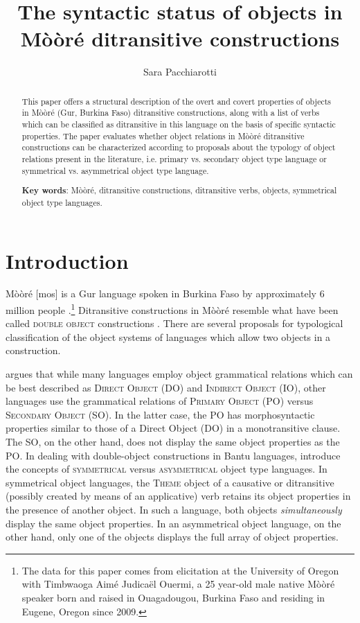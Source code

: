 \documentclass[output=paper]{langsci/langscibook}
\title{The syntactic status of objects in Mòòré ditransitive constructions}
\author{%
 Sara Pacchiarotti\affiliation{University of Oregon}
}
\begin{document}
\begin{abstract}
This paper offers a structural description of the overt and covert properties of objects in Mòòré (Gur, Burkina Faso) ditransitive constructions, along with a list of verbs which can be classified as ditransitive in this language on the basis of specific syntactic properties. The paper evaluates whether object relations in Mòòré ditransitive constructions can be characterized according to proposals about the typology of object relations present in the literature, i.e. primary vs. secondary object type language or symmetrical vs. asymmetrical object type language. 
\end{abstract}

\begin{abstract}
\textbf{Key words}: Mòòré, ditransitive constructions, ditransitive verbs, objects, symmetrical object type languages.  
\end{abstract}

\section{Introduction}\label{§1:introduction.pacchiarotti}

Mòòré [mos] is a Gur language spoken in Burkina Faso by approximately 6 million people \citep{lewisetal2016}.\footnote{The data for this paper comes from elicitation at the University of Oregon with Timbwaoga Aimé Judicaël Ouermi, a 25 year-old male native  Mòòré speaker born and raised in Ouagadougou, Burkina Faso and residing in Eugene, Oregon since 2009.} Ditransitive constructions in Mòòré resemble what have been called \textsc{double object} constructions \citep{dryer1986,dryer2007,goldberg1995}. There are several proposals for typological classification of the object systems of languages which allow two objects in a construction.

\citet{dryer1986} argues that while many languages employ object grammatical relations which can be best described as \textsc{Direct Object} (DO) and \textsc{Indirect Object} (IO), other languages use the grammatical relations of \textsc{Primary Object} (PO) versus \textsc{Secondary Object} (SO). In the latter case, the PO has morphosyntactic properties similar to those of a Direct Object (DO) in a monotransitive clause. The SO, on the other hand, does not display the same object properties as the PO. In dealing with double-object constructions in Bantu languages, \citet{bresnanmoshi1990} introduce the concepts of \textsc{symmetrical} versus \textsc{asymmetrical} object type languages. In symmetrical object languages, the \textsc{Theme} object of a causative or ditransitive (possibly created by means of an applicative) verb retains its object properties in the presence of another object. In such a language, both objects \textit{simultaneously }display the same object properties. In an asymmetrical object language, on the other hand, only one of the objects displays the full array of object properties. 
\end{document}
